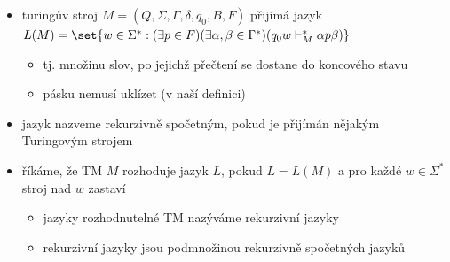 \begin{itemize}
\begin{itemize}
\begin{itemize}
\begin{itemize}
\end{itemize}
\item $\delta$ \dots{} (částečná) přechodová funkce
\begin{itemize}
\item zobrazení $(Q-F)\times\Gamma\to Q\times\Gamma\times\set{L,R}$
\item $\delta(q,X)=(p,Y,D)$
\begin{itemize}
\item $q\in (Q-F)$ \dots{} aktuální stav
\item $X\in \Gamma$ \dots{} aktuální symbol na pásce
\item $p\in Q$ \dots{} nový stav
\item $Y\in\Gamma$ \dots{} symbol pro zapsání do aktuální buňky, přepíše aktuální obsah
\item $D\in\set{L,R}$ \dots{} směr pohybu hlavy (doleva, doprava)
\end{itemize}
\end{itemize}
\item $q_0\in Q$ \dots{} počáteční stav
\item $B\in\Gamma-\Sigma$ \dots{} blank = symbol pro prázdné buňky, na začátku všude kromě konečného počtu buněk se vstupem
\item $F\subseteq Q$ \dots{} množina koncových neboli přijímajících stavů
\item poznámka: někdy se nerozlišuje $\Gamma$ a $\Sigma$ a neuvádí se $B$, pak je TM pětice
\end{itemize}
\item turingův stroj $M=(Q,\Sigma,\Gamma,\delta,q_0,B,F)$ přijímá jazyk $L(M)=\set{w\in\Sigma^*:(\exists p\in F)(\exists \alpha,\beta\in\Gamma^*)(q_0w\vdash_M^*\alpha p\beta)}$
\begin{itemize}
\item tj. množinu slov, po jejichž přečtení se dostane do koncového stavu
\item pásku nemusí uklízet (v naší definici)
\end{itemize}
\item jazyk nazveme rekurzivně spočetným, pokud je přijímán nějakým Turingovým strojem
\item říkáme, že TM $M$ rozhoduje jazyk $L$, pokud $L=L(M)$ a pro každé $w\in\Sigma^*$ stroj nad $w$ zastaví
\begin{itemize}
\item jazyky rozhodnutelné TM nazýváme rekurzivní jazyky
\item rekurzivní jazyky jsou podmnožinou rekurzivně spočetných jazyků

\end{itemize}
\end{itemize}
\end{itemize}
